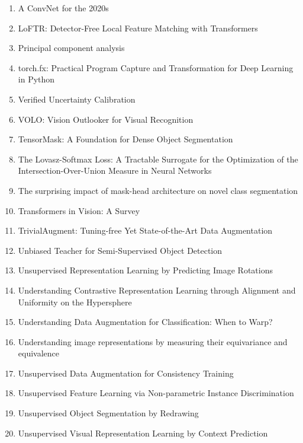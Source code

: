 \documentclass[acmlarge]{acmart}
\begin{document}
\begin{enumerate}
	\item A ConvNet for the 2020s \cite{Liu2022ACF}
	\item LoFTR: Detector-Free Local Feature Matching with Transformers \cite{Sun2021LoFTRDL}
	\item Principal component analysis \cite{Wold1987PrincipalCA}
	\item torch.fx: Practical Program Capture and Transformation for Deep Learning in Python \cite{Reed2021torchfxPP}
	\item Verified Uncertainty Calibration \cite{Kumar2019VerifiedUC}
	\item VOLO: Vision Outlooker for Visual Recognition \cite{Yuan2021VOLOVO}
	\item TensorMask: A Foundation for Dense Object Segmentation \cite{Chen2019TensorMaskAF}
	\item The Lovasz-Softmax Loss: A Tractable Surrogate for the Optimization of the Intersection-Over-Union Measure in Neural Networks \cite{Berman2018TheLL}
	\item The surprising impact of mask-head architecture on novel class segmentation \cite{Birodkar2021TheSI}
	\item Transformers in Vision: A Survey \cite{Khan2022TransformersIV}
	\item TrivialAugment: Tuning-free Yet State-of-the-Art Data Augmentation \cite{Mller2021TrivialAugmentTY}
	\item Unbiased Teacher for Semi-Supervised Object Detection \cite{Liu2021UnbiasedTF}
	\item Unsupervised Representation Learning by Predicting Image Rotations \cite{Gidaris2018UnsupervisedRL}
	\item Understanding Contrastive Representation Learning through Alignment and Uniformity on the Hypersphere \cite{Wang2020UnderstandingCR}
	\item Understanding Data Augmentation for Classification: When to Warp? \cite{Wong2016UnderstandingDA}
	\item Understanding image representations by measuring their equivariance and equivalence \cite{Lenc2015UnderstandingIR}
	\item Unsupervised Data Augmentation for Consistency Training \cite{Xie2020UnsupervisedDA}
	\item Unsupervised Feature Learning via Non-parametric Instance Discrimination \cite{Wu2018UnsupervisedFL}
	\item Unsupervised Object Segmentation by Redrawing \cite{Chen2019UnsupervisedOS}
	\item Unsupervised Visual Representation Learning by Context Prediction \cite{Doersch2015UnsupervisedVR}

\end{enumerate}
\end{document}
